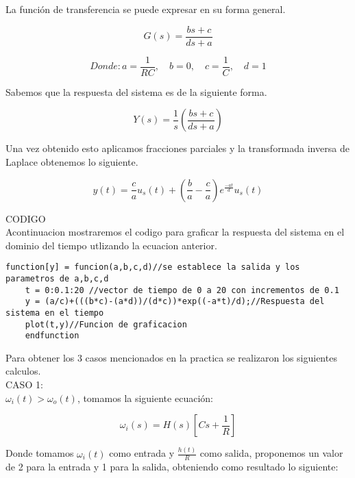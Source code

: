 \documentclass{report}
\newcounter{ns}
\begin{document}
	La función de transferencia se puede expresar en su forma general.
	
	\begin{equation*}
		G(s)=\frac{bs+c}{ds+a}
	\end{equation*}
	
	\begin{equation*}
	Donde:
		a=\frac{1}{RC},\quad b=0,\quad c=\frac{1}{C},\quad d=1
	\end{equation*}
	
	Sabemos que la respuesta del sistema es de la siguiente forma.
	
	\begin{equation*}
		Y(s)=\frac{1}{s}\left(\frac{bs+c}{ds+a}\right)
	\end{equation*}
	
	Una vez obtenido esto aplicamos fracciones parciales y la transformada inversa de Laplace obtenemos lo siguiente.
	
	\begin{equation*}
		y(t)=\frac{c}{a}u_s(t)+\left(\frac{b}{a}-\frac{c}{a}\right)e^\frac{-at}{d}u_s(t)
	\end{equation*}
	
	CODIGO\\
	
	Acontinuacion mostraremos el codigo para graficar la respuesta del sistema en el dominio del tiempo utlizando la ecuacion anterior.
	
	\begin{lstlisting}[frame=single]
	function[y] = funcion(a,b,c,d)//se establece la salida y los parametros de a,b,c,d
	t = 0:0.1:20 //vector de tiempo de 0 a 20 con incrementos de 0.1
	y = (a/c)+(((b*c)-(a*d))/(d*c))*exp((-a*t)/d);//Respuesta del sistema en el tiempo
	plot(t,y)//Funcion de graficacion
	endfunction
	\end{lstlisting}
		
	Para obtener los 3 casos mencionados en la practica se realizaron los siguientes calculos.\\
	
	CASO 1:\\
	
	$\omega_i(t) > \omega_o(t)$, tomamos la siguiente ecuación:
	
	\begin{equation*}
		\omega_i(s)=H(s)\left[Cs+\frac{1}{R}\right]
	\end{equation*}
		
	Donde tomamos $\omega_i(t)$ como entrada y $\frac{h(t)}{R}$ como salida, proponemos un valor de 2 para la entrada y 1 para la salida, obteniendo como resultado lo siguiente:
	
\end{document}

